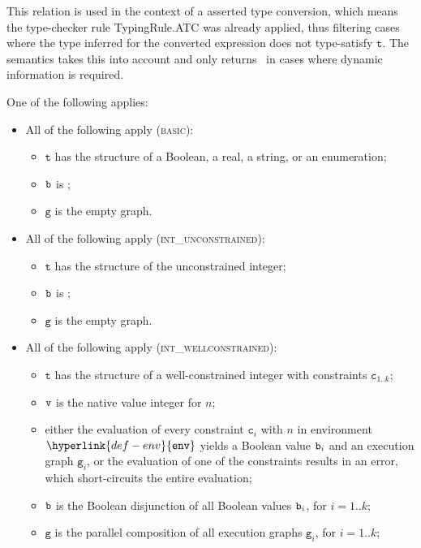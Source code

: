 \documentclass{book}
\newcommand\env[0]{\hyperlink{def-env}{\texttt{env}}}
\newcommand\vc[0]{\texttt{c}}
\newcommand\vg[0]{\texttt{g}}
\newcommand\vt[0]{\texttt{t}}
\begin{document}
This relation is used in the context of a asserted type conversion,
which means the type-checker rule TypingRule.ATC was already applied,
thus filtering cases where the type inferred for the converted expression
does not type-satisfy $\vt$. The semantics takes this into account and
only returns \False\ in cases where dynamic information is required.

One of the following applies:
\begin{itemize}
  \item All of the following apply (\textsc{basic}):
  \begin{itemize}
    \item $\vt$ has the structure of a Boolean, a real, a string, or an enumeration;
    \item $\texttt{b}$ is \True;
    \item $\vg$ is the empty graph.
  \end{itemize}

  \item All of the following apply (\textsc{int\_unconstrained}):
  \begin{itemize}
    \item $\vt$ has the structure of the unconstrained integer;
    \item $\texttt{b}$ is \True;
    \item $\vg$ is the empty graph.
  \end{itemize}

  \item All of the following apply (\textsc{int\_wellconstrained}):
  \begin{itemize}
    \item $\vt$ has the structure of a well-constrained integer with constraints $\vc_{1..k}$;
    \item $\texttt{v}$ is the native value integer for $n$;
    \item either the evaluation of every constraint $\vc_i$ with $n$ in environment $\env$
    yields a Boolean value $\texttt{b}_i$ and an execution graph $\vg_i$,
    or the evaluation of one of the constraints results in an error, which short-circuits the entire
    evaluation;
    \item $\texttt{b}$ is the Boolean disjunction of all Boolean values $\texttt{b}_i$, for $i=1..k$;
    \item $\vg$ is the parallel composition of all execution graphs $\vg_i$, for $i=1..k$;
  \end{itemize}


\end{itemize}
\end{document}
